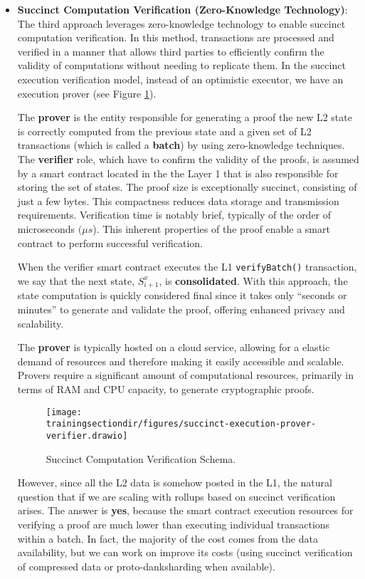 \begin{itemize}
\item \textbf{Succinct Computation Verification (Zero-Knowledge Technology)}: The third approach leverages zero-knowledge technology to enable succinct computation verification. In this method, transactions are processed and verified in a manner that allows third parties to efficiently confirm the validity of computations without needing to replicate them. In the succinct execution verification model, instead of an optimistic executor, we have an
execution prover (see Figure \ref{fig:zk-rollup}).

The \textbf{prover} is the entity responsible for generating a proof the new L2 state is correctly computed from the previous state and a given set of L2 transactions (which is called a \textbf{batch}) by using zero-knowledge techniques. The \textbf{verifier} role, which have to confirm the validity of the proofs, is assumed by a smart contract located in the the Layer 1 that is also responsible for storing the set of states. The proof size is exceptionally succinct, consisting of just a few bytes. This compactness reduces data storage and transmission requirements. Verification time is notably brief, typically of the order of microseconds $(\mu s$). This inherent properties of the proof enable a smart contract to perform successful verification.

When the verifier smart contract executes the L1 \texttt{verifyBatch()} transaction, we say that the next state, $S^x_{i+1}$, is \textbf{consolidated}. With this approach, the state computation is quickly considered final since it takes only ``seconds or minutes” to generate and validate the proof, offering enhanced privacy and scalability.

The \textbf{prover} is typically hosted on a cloud service, allowing for a elastic demand of resources and therefore making it easily accessible and scalable. Provers require a significant amount of computational resources, primarily in terms of RAM and CPU capacity, to generate cryptographic proofs.

\begin{figure}[h!]
\centering
\texttt{[image: \\trainingsectiondir/figures/succinct-execution-prover-verifier.drawio]}
\caption{Succinct Computation Verification Schema.}
\label{fig:zk-rollup}
\end{figure}

However, since all the L2 data is somehow posted in the L1, the natural question that if we are scaling with rollups based on succinct verification arises. The answer is \textbf{yes}, because the smart contract execution resources for verifying a proof are much lower than executing individual transactions within a batch. In fact, the majority of the cost comes from the data availability, but we can work on improve its costs (using succinct verification of compressed data or proto-danksharding when available).

\end{itemize}

